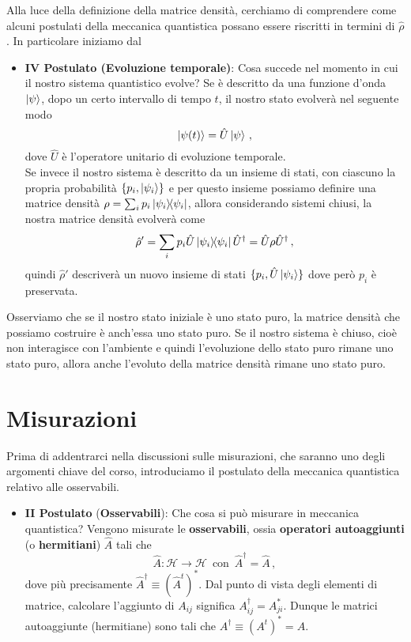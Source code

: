 \noindent Alla luce della definizione della matrice densità, cerchiamo di comprendere come alcuni postulati della meccanica quantistica possano essere riscritti in termini di $\hat \rho$. In particolare iniziamo dal
\begin{itemize}
    \item \textbf{IV Postulato (Evoluzione temporale)}: Cosa succede nel momento in cui il nostro sistema quantistico evolve? Se è descritto da una funzione d'onda $\ket \psi$, dopo un certo intervallo di tempo $t$, il nostro stato evolverà nel seguente modo
    \begin{equation*}
        \ket{\psi(t)}=\hat U\ket \psi \, ,
    \end{equation*}
    dove $\hat U$ è l'operatore unitario di evoluzione temporale.\\
    Se invece il nostro sistema è descritto da un insieme di stati, con ciascuno la propria probabilità $\{p_i, \ket{\psi_i}\}$ e per questo insieme possiamo definire una matrice densità $\rho=\sum_i p_i\op{\psi_i}{\psi_i}$, allora considerando sistemi chiusi, la nostra matrice densità evolverà come
    \begin{equation*}
        \hat \rho'=\sum_i p_i \hat U\op{\psi_i}{\psi_i}\hat U^\dagger = \hat U \rho \hat U^\dagger \, ,
    \end{equation*}
    quindi $\hat \rho'$ descriverà un nuovo insieme di stati  $\{p_i, \hat U\ket{\psi_i}\}$ dove però $p_i$ è preservata.\\
\end{itemize}
Osserviamo che se il nostro stato iniziale è uno stato puro, la matrice densità che possiamo costruire è anch'essa uno stato puro. Se il nostro sistema è chiuso, cioè non interagisce con l'ambiente e quindi l'evoluzione dello stato puro rimane uno stato puro, allora anche l'evoluto della matrice densità rimane uno stato puro.

\section{Misurazioni}
Prima di addentrarci nella discussioni sulle misurazioni, che saranno uno degli argomenti chiave del corso, introduciamo il postulato della meccanica quantistica relativo alle osservabili.
\begin{itemize}
    \item \textbf{II Postulato} (\textbf{Osservabili}): Che cosa si può misurare in meccanica quantistica? Vengono misurate le \textbf{osservabili}, ossia \textbf{operatori autoaggiunti} (o \textbf{hermitiani}) $\hat{A}$ tali che
    \begin{equation*}
        \hat{A}: \mathcal{H}\rightarrow \mathcal{H} \, \text{ con } \, \hat{A}^\dagger = \hat{A} \, ,
    \end{equation*}
    dove più precisamente $\hat{A}^\dagger \equiv (\hat{A}^t)^\ast$. Dal punto di vista degli elementi di matrice, calcolare l'aggiunto di $A_{ij}$ significa $A^\dagger_{ij} = A^\ast_{ji}$. Dunque le matrici autoaggiunte (hermitiane) sono tali che $A^\dagger \equiv (A^t)^\ast = A$.
\end{itemize}

